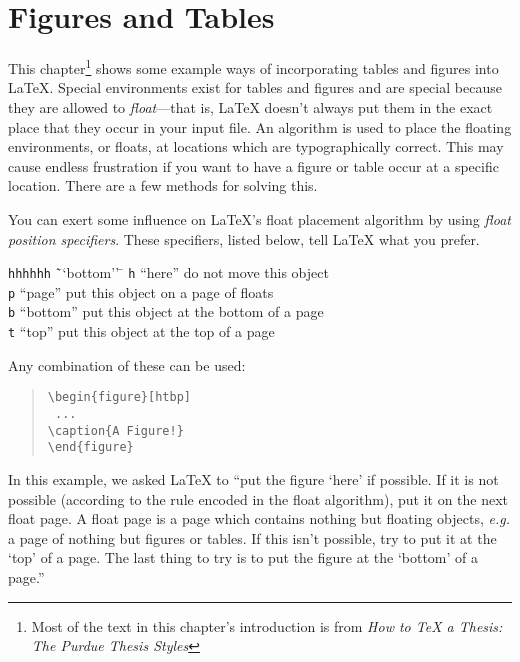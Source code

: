 \chapter{Figures and Tables}\label{quad}
This chapter\footnote{Most of the text in this chapter's introduction is from {\em How to
\TeX{} a Thesis: The Purdue Thesis Styles}} shows some example ways of incorporating tables and figures into \LaTeX{}.
Special environments exist for tables and figures and are special because they are
allowed to {\em float}---that is, \LaTeX{} doesn't always put them in the exact place
that they occur in your input file.  An algorithm is used to place the floating environments,
or floats, at locations which are typographically correct.  This may cause endless frustration
if you want to have a figure or table occur at a specific location.  There are a few
methods for solving this.

You can exert some influence on \LaTeX{}'s float placement algorithm by using
{\em float position specifiers}.  These specifiers, listed below, tell \LaTeX{}
what you prefer.
\begin{tabbing}
{\tt hhhhhh} \= ``bottom'' \=  \kill
{\tt h}\> ``here'' \> do not move this object \\
{\tt p}\> ``page'' \> put this object on a page of floats \\
{\tt b}\> ``bottom'' \> put this object at the bottom of a page\\
{\tt t}\> ``top'' \> put this object at the top of a page\\
\end{tabbing}

Any combination of these can be used:
\begin{quote}\tt\singlespace\begin{verbatim}
\begin{figure}[htbp]
 ...
\caption{A Figure!}
\end{figure}
\end{verbatim}\end{quote}

In this example, we asked \LaTeX{} to ``put the figure `here' if possible.  If it
is not possible (according to the rule encoded in the float algorithm), put it on the
next float page.  A float page is a page which contains nothing but floating objects,
{\em e.g.} a page of nothing but figures or tables.  If this isn't possible, try to put it
at the `top' of a page.  The last thing to try is to put the figure at the `bottom' of
a page.''


